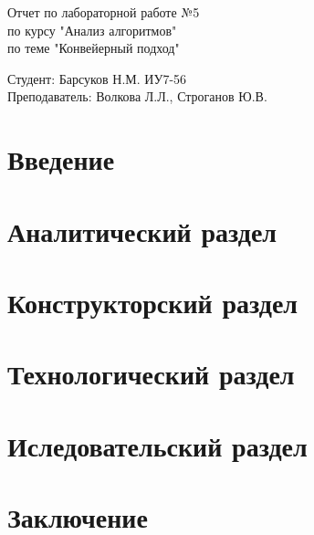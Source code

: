 \documentclass[a4paper, 14pt]{article}
\begin{document}
	\begin{titlepage}
		\begin{center}
			\begin{LARGE}
				Отчет по лабораторной работе №5\\
				по курсу "Анализ алгоритмов"\\
				по теме "Конвейерный подход"
			\end{LARGE}
			
			\begin{Large}
				\vspace{10cm}
				Студент: Барсуков Н.М. ИУ7-56\\
				Преподаватель: Волкова Л.Л.,
				Строганов Ю.В.
			\end{Large}
		\end{center}
	\end{titlepage}
	
	\newpage
	\tableofcontents
	
	\newpage
	\section*{Введение}
	
	
	\newpage
	\section{Аналитический раздел}
	
	
	\newpage
	\section{Конструкторский раздел}
	
	
	\newpage
	\section{Технологический раздел}
	
	
	\newpage
	\section{Иследовательский раздел}
	
	
	\newpage
	\section{Заключение}
	
	
\end{document}
